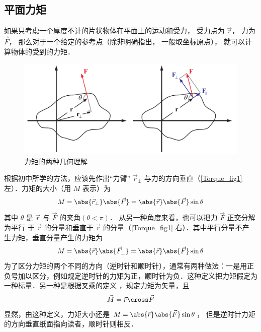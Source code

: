 

\subsection{平面力矩}

如果只考虑一个厚度不计的片状物体在平面上的运动和受力， 受力点为 $\vec r$， 力为 $\vec F$， 那么对于一个给定的参考点（除非明确指出， 一般取坐标原点）， 就可以计算物体的受到的力矩．


\begin{figure}[ht]
\centering
\includegraphics[width=13cm]{./figures/Torque.pdf}
\caption{力矩的两种几何理解}\label{Torque_fig1}
\end{figure}

根据初中所学的方法，应该先作出“力臂” ${\vec r_ \bot }$ 与力的方向垂直（\autoref{Torque_fig1} 左）．力矩的大小（用 $M$ 表示）为
\begin{equation}
M = \abs{\vec r_ \bot } \abs{\vec F} = \abs{\vec r} \abs{\vec F} \sin \theta 
\end{equation}
其中 $\theta $ 是 $\vec r$ 与 $\vec F$ 的夹角$(\theta < \pi)$． 
从另一种角度来看，也可以把力 $\vec F$ 正交分解为平行
于 $\vec r$ 的分量和垂直于 $\vec r$ 的分量（\autoref{Torque_fig1} 右）．其中平行分量不产
生力矩，垂直分量产生的力矩为
\begin{equation}
M = \abs{\vec r} \abs{\vec F_ \bot } = \abs{\vec r} \abs{\vec F} \sin \theta 
\end{equation}
为了区分力矩的两个不同的方向（逆时针和顺时针），通常有两种做法：一是用正负号加以区分，例如规定逆时针的力矩为正，顺时针为负．这种定义把力矩假定为一种标量．另一种是根据叉乘的定义
，规定力矩为矢量，且
\begin{equation}\label{Torque_eq3}
\vec M = \vec r \cross \vec F
\end{equation}
显然，由这种定义，力矩大小还是 $M = \abs{\vec r} \abs{\vec F}\sin \theta $， 但是逆时针力矩的方向垂直纸面指向读者，顺时针则相反．


